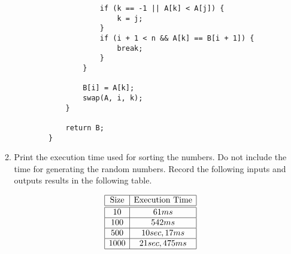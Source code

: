 \documentclass[14pt, a4paper]{article}
\begin{document}
\begin{enumerate}
\begin{enumerate}[label*=\arabic*]
\begin{verbatim}
                    if (k == -1 || A[k] < A[j]) {
                        k = j;
                    }
                    if (i + 1 < n && A[k] == B[i + 1]) {
                        break;
                    }
                }
    
                B[i] = A[k];
                swap(A, i, k);
            }
    
            return B;
        }
        \end{verbatim}
        
        \item Print the execution time used for sorting the numbers. Do not include the time for generating the random numbers. Record the following inputs and outputs results in the following table.
        
        \[
            \begin{array}{|c|c|}  	%
            \hline				%
            \mbox{Size} & \mbox{Execution Time} \\
            \hline\hline
              10    &   61ms \\
            \hline
              100   &   542ms \\
            \hline
              500   &   10 sec, 17ms \\
            \hline
             1000   &   21 sec, 475 ms\\
            \hline
            \end{array}
        \]
    
    \end{enumerate}



\end{enumerate}
\end{document}
